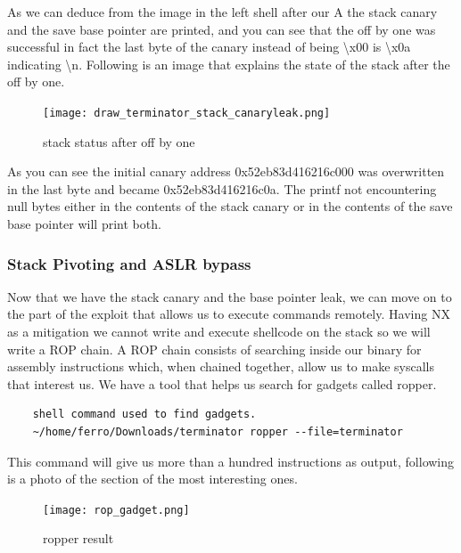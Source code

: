 \documentclass{report}
\begin{document}
    As we can deduce from the image in the left shell after our A the stack canary and the save base pointer are printed, and you can see that the off by one was successful in fact the last byte of the canary instead of being \textbackslash x00 is \textbackslash x0a indicating \textbackslash n. \newline
    \clearpage
    Following is an image that explains the state of the stack after the off by one.\newline
    \begin{figure}[h]
        \centering
        \texttt{[image: draw\_terminator\_stack\_canaryleak.png]}
        \caption{stack status after off by one}
        \label{fig:stack terminator}
    \end{figure}
    As you can see the initial canary address 0x52eb83d416216c000
    was overwritten in the last byte and became 0x52eb83d416216c0a.
    The printf not encountering null bytes either in the contents of the stack canary or in the contents of the save base pointer will print both.\newline
    \subsubsection{Stack Pivoting and ASLR bypass}
    Now that we have the stack canary and the base pointer leak, we can move on to the part of the exploit that allows us to execute commands remotely.\newline
    Having NX as a mitigation we cannot write and execute shellcode on the stack so we will write a ROP chain.
    A ROP chain consists of searching inside our binary for assembly instructions which, when chained together, allow us to make syscalls that interest us.\newline
    \clearpage
    We have a tool that helps us search for gadgets called ropper.\newline
    \begin{verbatim}
    shell command used to find gadgets.
    ~/home/ferro/Downloads/terminator ropper --file=terminator
    \end{verbatim}
    This command will give us more than a hundred instructions as output, following is a photo of the section of the most interesting ones.\newline
    \begin{figure}[h]
        \centering
        \texttt{[image: rop\_gadget.png]}
        \caption{ropper result}
        \label{fig:ropper}
    \end{figure}
    
\end{document}
